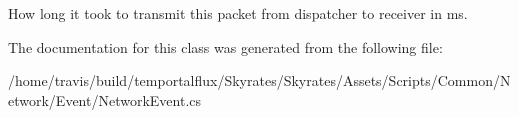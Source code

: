 How long it took to transmit this packet from dispatcher to receiver in ms. 



The documentation for this class was generated from the following file\-:\begin{DoxyCompactItemize}
\item 
/home/travis/build/temportalflux/\-Skyrates/\-Skyrates/\-Assets/\-Scripts/\-Common/\-Network/\-Event/Network\-Event.\-cs\end{DoxyCompactItemize}
